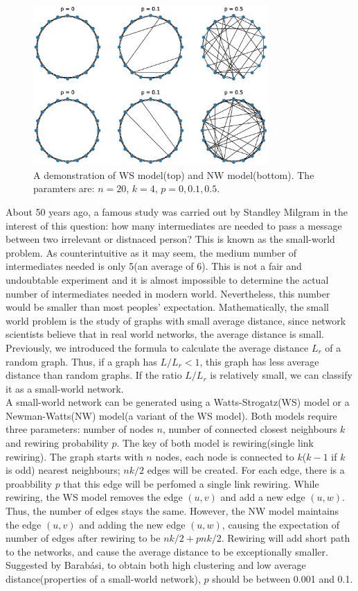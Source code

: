 \documentclass[12pt]{article}
\begin{document}
\begin{figure}[h]
    \includegraphics[width = 0.8\textwidth]{small_world_network_model.eps}
    \centering
    \caption{A demonstration of WS model(top) and NW model(bottom). The paramters are: $n=20$, $k=4$, $p=0,0.1,0.5$.}
    \label{fig:small_world_models}
\end{figure}
About 50 years ago, a famous study was carried out by Standley Milgram\cite{milgram1967small} in the interest of this question: how many intermediates are needed to pass a message between two irrelevant or distnaced person? This is known as the small-world problem. As counterintuitive as it may seem, the medium number of intermediates needed is only 5(an average of 6). This is not a fair and undoubtable experiment and it is almost impossible to determine the actual number of intermediates needed in modern world. Nevertheless, this number would be smaller than most peoples' expectation. Mathematically, the small world problem is the study of graphs with small average distance, since network scientists believe that in real world networks, the average distance is small. Previously, we introduced the formula to calculate the average distance $L_r$ of a random graph. Thus, if a graph has $L/L_r <1$, this graph has less average distance than random graphs. If the ratio $L/L_r$ is relatively small, we can classify it as a small-world network.\\
\noindent
A small-world network can be generated using a Watts-Strogatz(WS) model\cite{wsmodel} or a Newman-Watts(NW) model(a variant of the WS model)\cite{nwmodel}. Both models require three parameters: number of nodes $n$, number of connected closest neighbours $k$ and rewiring probability $p$. The key of both model is rewiring(single link rewiring). The graph starts with $n$ nodes, each node is connected to $k$($k-1$ if $k$ is odd) nearest neighbours; $nk/2$ edges will be created. For each edge, there is a proabbility $p$ that this edge will be perfomed a single link rewiring. While rewiring, the WS model removes the edge $(u,v)$ and add a new edge $(u,w)$. Thus, the number of edges stays the same. However, the NW model maintains the edge $(u,v)$ and adding the new edge $(u,w)$, causing the expectation of number of edges after rewiring to be $nk/2+pnk/2$. Rewiring will add short path to the networks, and cause the average distance to be exceptionally smaller. Suggested by Barabási\cite{barabási2016network}, to obtain both high clustering and low average distance(properties of a small-world network), $p$ should be between 0.001 and 0.1.\\
\end{document}
